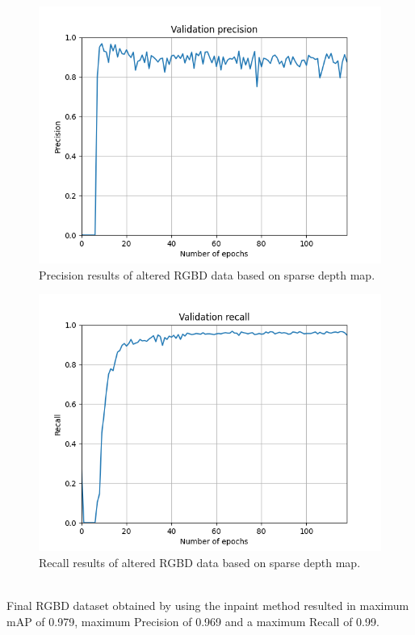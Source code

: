\documentclass[twoside]{ctuthesis}
\theoremstyle{plain}
\theoremstyle{definition}
\theoremstyle{note}
\begin{document}
\pagebreak
\begin{figure}[h!]
	\centering
	\includegraphics[width=\textwidth]{run-depth_filter120e-tag-validation_precision.png}
	\caption{Precision results of altered RGBD data based on sparse depth map.}
\end{figure}
\begin{figure}[h!]
	\centering
	\includegraphics[width=\textwidth]{run-depth_filter120e-tag-validation_recall.png}
	\caption{Recall results of altered RGBD data based on sparse depth map.}
\end{figure}
\pagebreak
\\
Final RGBD dataset obtained by using the inpaint method resulted in maximum mAP of 0.979, maximum Precision of 0.969 and a maximum Recall of 0.99. 
\end{document}
